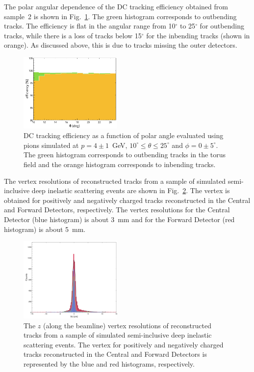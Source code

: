 The polar angular dependence of the DC tracking efficiency obtained from sample~2 is shown in
Fig.~\ref{fig:trkeffinoutb}. The green histogram corresponds to outbending tracks. The efficiency is flat
in the angular range from 10$^\circ$ to 25$^\circ$ for outbending tracks, while there is a loss of tracks below
15$^\circ$ for the inbending tracks (shown in orange). As discussed above, this is due to tracks missing the outer
detectors.
\begin{figure}[t]
\includegraphics[width=0.45\textwidth]{pics/DCTrkEffvsThetaInandOutbenders.png}
\caption{DC tracking efficiency as a function of polar angle evaluated using pions simulated at $p=4\pm 1$~GeV,
  $10^\circ \leq \theta \leq 25^\circ$ and $\phi = 0 \pm 5^\circ$. The green histogram corresponds to outbending
  tracks in the torus field and the orange histogram corresponds to inbending tracks.}
\label{fig:trkeffinoutb}
\end{figure}

The vertex resolutions of reconstructed tracks from a sample of simulated semi-inclusive deep inelastic scattering
events are shown in Fig.~\ref{fig:vtxres}. The vertex is obtained for positively and negatively {\color{red} charged tracks} reconstructed
in the Central and Forward Detectors, respectively. The vertex resolutions for the Central Detector (blue histogram)
is about 3~mm and for the Forward Detector (red histogram) is about 5~mm. 
\begin{figure}[ht]
\includegraphics[width=0.45\textwidth]{pics/VertexResolution.png}
\caption{The $z$ (along the beamline) vertex resolutions of reconstructed tracks from a sample of simulated
  semi-inclusive deep inelastic scattering events. The vertex for positively and negatively charged tracks reconstructed
  in the Central and Forward Detectors is represented by the blue and red histograms, respectively.}
\label{fig:vtxres}
\end{figure}

